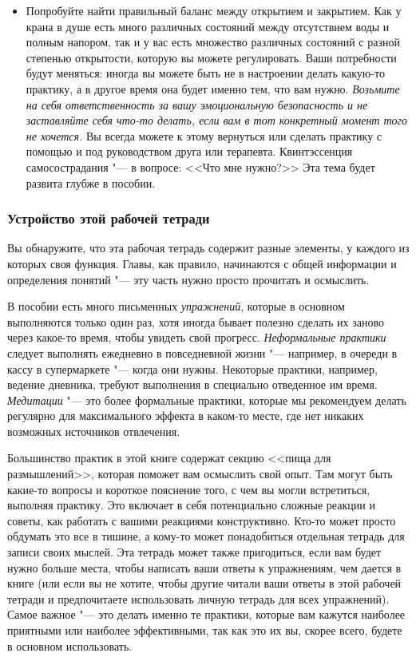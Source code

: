 \begin{itemize}
		\item Попробуйте найти правильный баланс между открытием и закрытием. Как у крана в душе есть много различных состояний между отсутствием воды и полным напором, так и у вас есть множество различных состояний с разной степенью открытости, которую вы можете регулировать. Ваши потребности будут меняться: иногда вы можете быть не в настроении делать какую-то практику, а в другое время она будет именно тем, что вам нужно. \emph{Возьмите на себя ответственность за вашу эмоциональную безопасность и не заставляйте себя что-то делать, если вам в тот конкретный момент того не хочется.} Вы всегда можете к этому вернуться или сделать практику с помощью и под руководством друга или терапевта. Квинтэссенция самосострадания "--- в вопросе: <<Что мне нужно?>> Эта тема будет развита глубже в пособии. 
	\end{itemize}
	
	
	\subsubsection*{Устройство этой рабочей тетради}
	
	Вы обнаружите, что эта рабочая тетрадь содержит разные элементы, у каждого из которых своя функция. Главы, как правило, начинаются с общей информации и определения понятий "--- эту часть нужно просто прочитать и осмыслить. 
	
	В пособии есть много письменных \emph{упражнений}, которые в основном выполняются только один раз, хотя иногда бывает полезно сделать их заново через какое-то время, чтобы увидеть свой прогресс. \emph{Неформальные практики} следует выполнять ежедневно в повседневной жизни "--- например, в очереди в кассу в супермаркете "--- когда они нужны. Некоторые практики, например, ведение дневника, требуют выполнения в специально отведенное им время. \emph{Медитации} "--- это более формальные практики, которые мы рекомендуем делать регулярно для максимального эффекта в каком-то месте, где нет никаких возможных источников отвлечения. 
	
	Большинство практик в этой книге содержат секцию <<пища для размышлений>>, которая поможет вам осмыслить свой опыт. Там могут быть какие-то вопросы и короткое пояснение того,  с чем вы могли встретиться, выполняя практику.  Это включает в себя потенциально сложные реакции и советы, как работать с вашими реакциями конструктивно. Кто-то может просто обдумать это все в тишине, а кому-то может понадобиться отдельная тетрадь для записи своих мыслей. Эта тетрадь может также пригодиться, если вам будет нужно больше места, чтобы написать ваши ответы к упражнениям, чем дается в книге (или если вы не хотите, чтобы другие читали ваши ответы в этой рабочей тетради и предпочитаете использовать личную тетрадь для всех упражнений). Самое важное "--- это делать именно те практики, которые вам кажутся наиболее приятными или наиболее эффективными, так как это их вы, скорее всего, будете в основном использовать. 
	
